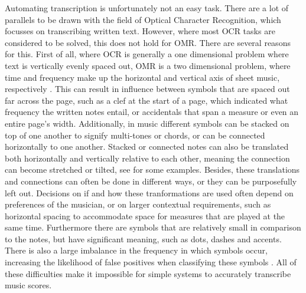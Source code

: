 Automating transcription is unfortunately not an easy task. There are a lot of parallels to be drawn with the field of Optical Character Recognition, which focusses on transcribing written text. However, where most OCR tasks are considered to be solved, this does not hold for OMR. There are several reasons for this. First of all, where OCR is generally a one dimensional problem where text is vertically evenly spaced out, OMR is a two dimensional problem, where time and frequency make up the horizontal and vertical axis of sheet music, respectively \citep{Byrd2015}. This can result in influence between symbols that are spaced out far across the page, such as a clef at the start of a page, which indicated what frequency the written notes entail, or accidentals that span a measure or even an entire page's width. Additionally, in music different symbols can be stacked on top of one another to signify multi-tones or chords, or can be connected horizontally to one another. Stacked or connected notes can also be translated both horizontally and vertically relative to each other, meaning the connection can become stretched or tilted, see \citep{Bainbridge2001} for some examples. Besides, these translations and connections can often be done in different ways, or they can be purposefully left out. Decisions on if and how these tranformations are used often depend on preferences of the musician, or on larger contextual requirements, such as horizontal spacing to accommodate space for measures that are played at the same time. Furthermore there are symbols that are relatively small in comparison to the notes, but have significant meaning, such as dots, dashes and accents. There is also a large imbalance in the frequency in which symbols occur, increasing the likelihood of false positives when classifying these symbols \citep{Chen2016b}. All of these difficulties make it impossible for simple systems to accurately transcribe music scores.

